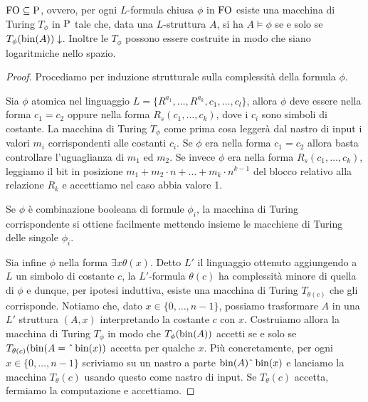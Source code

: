 \begin{lemma}
 $\FO \subseteq \P$, ovvero, per ogni $L$-formula chiusa $\phi$ in $\FO$ esiste
 una macchina di Turing $T_\phi$ in $\P$ tale che, data una $L$-struttura $A$,
 si ha $A \models \phi$ se e solo se $T_\phi(\bin(A))\downarrow$. Inoltre
 le $T_\phi$ possono essere costruite in modo che siano logaritmiche nello spazio.
\end{lemma}
\begin{proof}
 Procediamo per induzione strutturale sulla complessità della formula $\phi$.
 
 Sia $\phi$ atomica nel linguaggio $L=\{ R^{a_1},\ldots,R^{a_k},c_1,\ldots,c_l \}$,
 allora $\phi$ deve essere nella forma $c_1=c_2$ oppure nella forma $R_s(c_1,\ldots, c_k)$,
 dove i $c_i$ sono simboli di costante. La macchina di Turing $T_\phi$ come
 prima cosa leggerà dal nastro di
 input i valori $m_i$ corrispondenti alle costanti $c_i$.
 Se $\phi$ era nella forma $c_1 = c_2$ allora basta controllare l'uguaglianza
 di $m_1$ ed $m_2$. Se invece $\phi$ era nella forma $R_s(c_1,\ldots,c_k)$,
 leggiamo il bit in posizione $m_1 + m_2 \cdot n + \ldots + m_k \cdot n^{k-1}$
 del blocco relativo alla relazione $R_k$ e accettiamo nel caso abbia valore 1.
 
 Se $\phi$ è combinazione booleana di formule $\phi_i$,
 la macchina di Turing corrispondente si ottiene facilmente mettendo insieme le
 macchiene di Turing delle singole $\phi_i$.
 
 Sia infine $\phi$ nella forma $\exists x \theta(x)$. Detto $L'$ il linguaggio
 ottenuto aggiungendo a $L$ un simbolo di costante $c$,
 la $L'$-formula $\theta(c)$ ha complessità minore di quella di $\phi$
 e dunque, per ipotesi induttiva, esiste una
 macchina di Turing $T_{\theta(c)}$ che gli corrisponde.
 Notiamo che, dato $x \in \{0,\ldots, n-1\}$, possiamo trasformare $A$ in una $L'$
 struttura $(A,x)$ interpretando la costante $c$ con $x$.
 Costruiamo allora la macchina di Turing $T_\phi$ in modo che $T_\phi(\bin(A))$
 accetti se e solo se $T_{\theta(c)}(\bin(A=\string^\bin(x))$ accetta per qualche $x$.
 Più concretamente, per ogni $x \in \{0,\ldots,n-1\}$
 scriviamo su un nastro a parte $\bin(A)\string^\bin(x)$ e lanciamo la macchina
 $T_\theta(c)$ usando questo come nastro di input. Se $T_\theta(c)$ accetta,
 fermiamo la computazione e accettiamo.
\end{proof}


